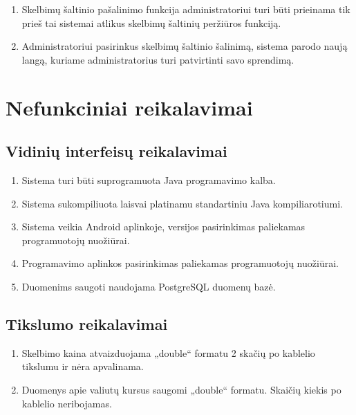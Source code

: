\documentclass[12pt]{article}
\renewcommand{\thesubsection}{FR\arabic{subsection}}
\renewcommand*{\theenumi}{\thesubsection.\arabic{enumi}}
\renewcommand*{\theenumii}{\thesubsubsection.\theenumi.\arabic{enumii}}
\begin{document}
	\begin{enumerate}[resume,labelindent=10pt,leftmargin=2.2cm]
		\item Skelbimų šaltinio pašalinimo funkcija administratoriui turi būti prieinama tik prieš tai sistemai atlikus skelbimų šaltinių peržiūros funkciją.
		\item Administratoriui pasirinkus skelbimų šaltinio šalinimą, sistema parodo naują langą, kuriame administratorius turi patvirtinti savo sprendimą.
	\end{enumerate}
	\pagebreak
	
	\renewcommand{\thesubsection}{NFR\arabic{subsection}}
	\renewcommand*{\theenumi}{\thesubsection.\arabic{enumi}}
	\renewcommand*{\theenumii}{\theenumi.\arabic{enumii}}
	\section*{Nefunkciniai reikalavimai}
	\setcounter{subsection}{0}
	
	\subsection{Vidinių interfeisų reikalavimai}
	\begin{enumerate}[labelindent=10pt,leftmargin=2.2cm]
		\item Sistema turi būti suprogramuota Java programavimo kalba.
		\item Sistema sukompiliuota laisvai platinamu standartiniu Java kompiliarotiumi.
		\item Sistema veikia Android aplinkoje, versijos pasirinkimas paliekamas programuotojų nuožiūrai.
		\item Programavimo aplinkos pasirinkimas paliekamas programuotojų nuožiūrai.
		\item Duomenims saugoti naudojama PostgreSQL duomenų bazė.
	\end{enumerate}	
	
	
	\subsection{Tikslumo reikalavimai}
	\begin{enumerate}[labelindent=10pt,leftmargin=2.2cm]
		\item Skelbimo kaina atvaizduojama „double“ formatu 2 skačių po kablelio tikslumu ir nėra apvalinama.
		\item Duomenys apie valiutų kursus saugomi „double“ formatu. Skaičių kiekis po kablelio neribojamas.
	\end{enumerate}	
	
\end{document}
